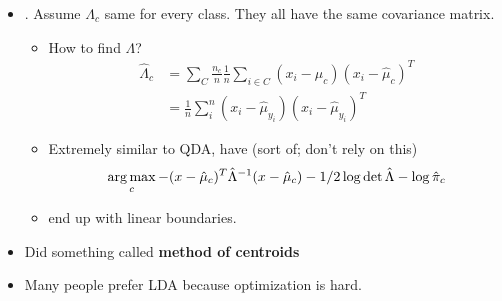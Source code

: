 \documentclass[12pt]{article}
\begin{document}
\begin{itemize}
	\item {}. Assume $\Lambda_c$ same for every class. They all have the same covariance matrix. 
	\begin{itemize}
		\item How to find $\Lambda$?
		\begin{align}
		\hat{\Lambda}_c &= \sum_C \frac{n_c}{n} \frac{1}{n}\sum_{i\in C} (x_i - \hat{\mu}_c) (x_i - \hat{\mu}_c)^T \\
		&= \frac{1}{n}\sum_i^n (x_i - \hat{\mu}_{y_i}) (x_i - \hat{\mu}_{y_i})^T 
		\end{align}
		\item Extremely similar to QDA, have (sort of; don't rely on this)
		\begin{align}
		\operatorname*{arg\,max}_c  -  (x - \hat{\mu}_c)^T \hat{\Lambda}^{-1} (x - \hat{\mu}_c) - 1/2 \log \det \hat{\Lambda} - \log \hat{\pi}_c 
		\end{align}
		\item end up with linear boundaries. 
	\end{itemize}

	\item Did something called \textbf{method of centroids}
	\item Many people prefer LDA because optimization is hard.
	
\end{itemize}

\end{document}
